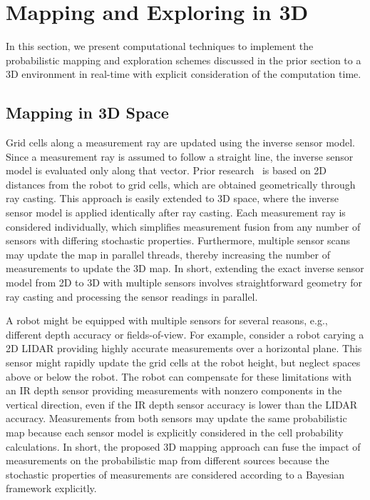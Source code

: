\documentclass[smallextended]{svjour3}       %
\begin{document}
\section{Mapping and Exploring in 3D}

In this section, we present computational techniques to implement the probabilistic mapping and exploration schemes discussed in the prior section to a 3D environment in real-time with explicit consideration of the computation time.

\subsection{Mapping in 3D Space}

Grid cells along a measurement ray are updated using the inverse sensor model. Since a measurement ray is assumed to follow a straight line, the inverse sensor model is evaluated only along that vector. Prior research~\cite{KauLeeAiMos16,KauTakAiLee17} is based on 2D distances from the robot to grid cells, which are obtained geometrically through ray casting. This approach is easily extended to 3D space, where the inverse sensor model is applied identically after ray casting. Each measurement ray is considered individually, which simplifies measurement fusion from any number of sensors with differing stochastic properties. Furthermore, multiple sensor scans may update the map in parallel threads, thereby increasing the number of measurements to update the 3D map. In short, extending the exact inverse sensor model from 2D to 3D with multiple sensors involves straightforward geometry for ray casting and processing the sensor readings in parallel.

A robot might be equipped with multiple sensors for several reasons, e.g., different depth accuracy or fields-of-view. For example, consider a robot carying a 2D LIDAR providing highly accurate measurements over a horizontal plane. This sensor might rapidly update the grid cells at the robot height, but neglect spaces above or below the robot. The robot can compensate for these limitations with an IR depth sensor providing measurements with nonzero components in the vertical direction, even if the IR depth sensor accuracy is lower than the LIDAR accuracy. Measurements from both sensors may update the same probabilistic map because each sensor model is explicitly considered in the cell probability calculations. In short, the proposed 3D mapping approach can fuse the impact of measurements on the probabilistic map from different sources because the stochastic properties of measurements are considered according to a Bayesian framework explicitly.
\end{document}

